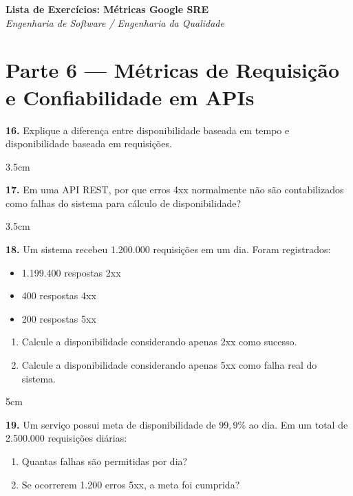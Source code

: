 \documentclass[12pt]{article}
\begin{document}

\begin{center}
  {\Large \textbf{Lista de Exercícios: Métricas Google SRE}}\\[0.2cm]
  \textit{Engenharia de Software / Engenharia da Qualidade}
\end{center}

\vspace{0.4cm}

\section*{Parte 6 — Métricas de Requisição e Confiabilidade em APIs}

\textbf{16.} Explique a diferença entre disponibilidade baseada em tempo e disponibilidade baseada em requisições.
\begin{resposta}{3.5cm}
\end{resposta}

\textbf{17.} Em uma API REST, por que erros 4xx normalmente não são contabilizados como falhas do sistema para cálculo de disponibilidade?
\begin{resposta}{3.5cm}
\end{resposta}

\textbf{18.} Um sistema recebeu 1.200.000 requisições em um dia. 
Foram registrados:
\begin{itemize}
    \item 1.199.400 respostas 2xx
    \item 400 respostas 4xx
    \item 200 respostas 5xx
\end{itemize}

\begin{enumerate}[label=\alph*)]
    \item Calcule a disponibilidade considerando apenas 2xx como sucesso.
    \item Calcule a disponibilidade considerando apenas 5xx como falha real do sistema.
\end{enumerate}

\begin{resposta}{5cm}
\end{resposta}

\textbf{19.} Um serviço possui meta de disponibilidade de $99,9\%$ ao dia. 
Em um total de 2.500.000 requisições diárias:
\begin{enumerate}[label=\alph*)]
    \item Quantas falhas são permitidas por dia?
    \item Se ocorrerem 1.200 erros 5xx, a meta foi cumprida?
\end{enumerate}
\end{document}

